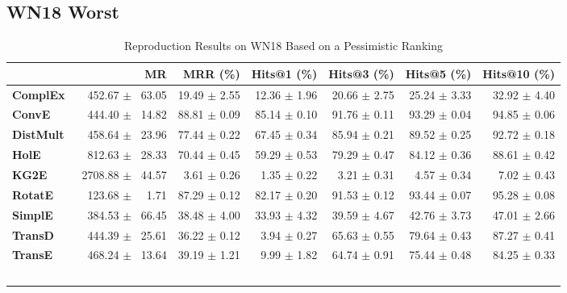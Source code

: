 \documentclass[journal]{IEEEtran}
\begin{document}
\subsection{WN18 Worst}
    \begin{table*}
        \caption{Reproduction Results on WN18 Based on a Pessimistic Ranking}
        \label{tab:wn18_full_results_pessimistic_ranking}
        \centering
        \begin{tabular}{lrrrrrr}
\toprule
{} &                 MR &      MRR (\%) &   Hits@1 (\%) &   Hits@3 (\%) &   Hits@5 (\%) &  Hits@10 (\%) \\
\midrule
\textbf{ComplEx } &  $\phantom{5}$$\phantom{5}$452.67 $\pm$ $\phantom{5}$63.05 &  19.49 $\pm$ 2.55 &  12.36 $\pm$ 1.96 &  20.66 $\pm$ 2.75 &  25.24 $\pm$ 3.33 &  32.92 $\pm$ 4.40 \\
\textbf{ConvE   } &  $\phantom{5}$$\phantom{5}$444.40 $\pm$ $\phantom{5}$14.82 &  88.81 $\pm$ 0.09 &  85.14 $\pm$ 0.10 &  91.76 $\pm$ 0.11 &  93.29 $\pm$ 0.04 &  94.85 $\pm$ 0.06 \\
\textbf{DistMult} &  $\phantom{5}$$\phantom{5}$458.64 $\pm$ $\phantom{5}$23.96 &  77.44 $\pm$ 0.22 &  67.45 $\pm$ 0.34 &  85.94 $\pm$ 0.21 &  89.52 $\pm$ 0.25 &  92.72 $\pm$ 0.18 \\
\textbf{HolE    } &  $\phantom{5}$$\phantom{5}$812.63 $\pm$ $\phantom{5}$28.33 &  70.44 $\pm$ 0.45 &  59.29 $\pm$ 0.53 &  79.29 $\pm$ 0.47 &  84.12 $\pm$ 0.36 &  88.61 $\pm$ 0.42 \\
\textbf{KG2E    } &  $\phantom{5}$2708.88 $\pm$ $\phantom{5}$44.57 &  $\phantom{5}$3.61 $\pm$ 0.26 &  $\phantom{5}$1.35 $\pm$ 0.22 &  $\phantom{5}$3.21 $\pm$ 0.31 &  $\phantom{5}$4.57 $\pm$ 0.34 &  $\phantom{5}$7.02 $\pm$ 0.43 \\
\textbf{RotatE  } &  $\phantom{5}$$\phantom{5}$123.68 $\pm$ $\phantom{5}$$\phantom{5}$1.71 &  87.29 $\pm$ 0.12 &  82.17 $\pm$ 0.20 &  91.53 $\pm$ 0.12 &  93.44 $\pm$ 0.07 &  95.28 $\pm$ 0.08 \\
\textbf{SimplE  } &  $\phantom{5}$$\phantom{5}$384.53 $\pm$ $\phantom{5}$66.45 &  38.48 $\pm$ 4.00 &  33.93 $\pm$ 4.32 &  39.59 $\pm$ 4.67 &  42.76 $\pm$ 3.73 &  47.01 $\pm$ 2.66 \\
\textbf{TransD  } &  $\phantom{5}$$\phantom{5}$444.39 $\pm$ $\phantom{5}$25.61 &  36.22 $\pm$ 0.12 &  $\phantom{5}$3.94 $\pm$ 0.27 &  65.63 $\pm$ 0.55 &  79.64 $\pm$ 0.43 &  87.27 $\pm$ 0.41 \\
\textbf{TransE  } &  $\phantom{5}$$\phantom{5}$468.24 $\pm$ $\phantom{5}$13.64 &  39.19 $\pm$ 1.21 &  $\phantom{5}$9.99 $\pm$ 1.82 &  64.74 $\pm$ 0.91 &  75.44 $\pm$ 0.48 &  84.25 $\pm$ 0.33 \\
$$
\end{tabular}
\end{table*}
\end{document}

